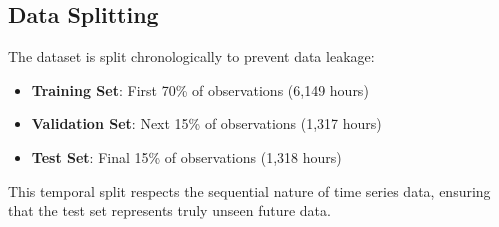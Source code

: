 \subsection{Data Splitting}

The dataset is split chronologically to prevent data leakage:

\begin{itemize}
    \item \textbf{Training Set}: First 70\% of observations (6,149 hours)
    \item \textbf{Validation Set}: Next 15\% of observations (1,317 hours)
    \item \textbf{Test Set}: Final 15\% of observations (1,318 hours)
\end{itemize}

This temporal split respects the sequential nature of time series data, ensuring that the test set represents truly unseen future data.

